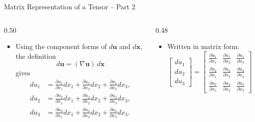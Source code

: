 \documentclass[aspectratio=169,11pt]{beamer}
\begin{document}
\begin{frame}{Matrix Representation of a Tensor -- Part 2}

\begin{columns}[T,onlytextwidth]
\begin{column}{0.50\textwidth}
\begin{itemize}

\item Using the component forms of \(d\mathbf{u}\) and \(d\mathbf{x}\),
the definition
\[
d\mathbf{u} = (\nabla \mathbf{u})\, d\mathbf{x}
\]
gives
\begin{align*}
du_1 &= \frac{\partial u_1}{\partial x_1} dx_1
     + \frac{\partial u_1}{\partial x_2} dx_2
     + \frac{\partial u_1}{\partial x_3} dx_3, \\
du_2 &= \frac{\partial u_2}{\partial x_1} dx_1
     + \frac{\partial u_2}{\partial x_2} dx_2
     + \frac{\partial u_2}{\partial x_3} dx_3, \\
du_3 &= \frac{\partial u_3}{\partial x_1} dx_1
     + \frac{\partial u_3}{\partial x_2} dx_2
     + \frac{\partial u_3}{\partial x_3} dx_3.
\end{align*}

\end{itemize}
\end{column}
\begin{column}{0.48\textwidth}
\begin{itemize}

\item Written in matrix form:
\[
\begin{bmatrix}
du_1 \\ du_2 \\ du_3
\end{bmatrix}
=
\begin{bmatrix}
\frac{\partial u_1}{\partial x_1} &
\frac{\partial u_1}{\partial x_2} &
\frac{\partial u_1}{\partial x_3} \\[6pt]
\frac{\partial u_2}{\partial x_1} &
\frac{\partial u_2}{\partial x_2} &
\frac{\partial u_2}{\partial x_3} \\[6pt]
\frac{\partial u_3}{\partial x_1} &
\frac{\partial u_3}{\partial x_2} &
\frac{\partial u_3}{\partial x_3}
\end{bmatrix}
\begin{bmatrix}
dx_1 \\ dx_2 \\ dx_3
\end{bmatrix}.
\]

\end{itemize}
\end{column}
\end{columns}

\end{frame}
\end{document}
